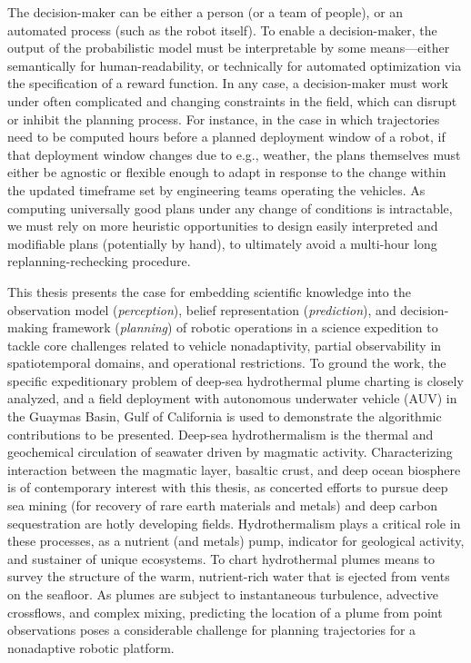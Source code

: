The decision-maker can be either a person (or a team of people), or an automated process (such as the robot itself). 
To enable a decision-maker, the output of the probabilistic model must be interpretable by some means---either semantically for human-readability, or technically for automated optimization via the specification of a reward function.
In any case, a decision-maker must work under often complicated and changing constraints in the field, which can disrupt or inhibit the planning process.
For instance, in the case in which trajectories need to be computed hours before a planned deployment window of a robot, if that deployment window changes due to e.g., weather, the plans themselves must either be agnostic or flexible enough to adapt in response to the change within the updated timeframe set by engineering teams operating the vehicles.
As computing universally good plans under any change of conditions is intractable, we must rely on more heuristic opportunities to design easily interpreted and modifiable plans (potentially by hand), to ultimately avoid a multi-hour long replanning-rechecking procedure.

This thesis presents the case for embedding scientific knowledge into the observation model (\emph{perception}), belief representation (\emph{prediction}), and decision-making framework (\emph{planning}) of robotic operations in a science expedition to tackle core challenges related to vehicle nonadaptivity, partial observability in spatiotemporal domains, and operational restrictions. 
To ground the work, the specific expeditionary problem of deep-sea hydrothermal plume charting is closely analyzed, and a field deployment with autonomous underwater vehicle (AUV) \Sentry in the Guaymas Basin, Gulf of California is used to demonstrate the algorithmic contributions to be presented.
Deep-sea hydrothermalism is the thermal and geochemical circulation of seawater driven by magmatic activity.
Characterizing interaction between the magmatic layer, basaltic crust, and deep ocean biosphere is of contemporary interest with this thesis, as concerted efforts to pursue deep sea mining (for recovery of rare earth materials and metals) and deep carbon sequestration are hotly developing fields.
Hydrothermalism plays a critical role in these processes, as a nutrient (and metals) pump, indicator for geological activity, and sustainer of unique ecosystems.
To chart hydrothermal plumes means to survey the structure of the warm, nutrient-rich water that is ejected from vents on the seafloor.
As plumes are subject to instantaneous turbulence, advective crossflows, and complex mixing, predicting the location of a plume from point observations poses a considerable challenge for planning trajectories for a nonadaptive robotic platform.
 
